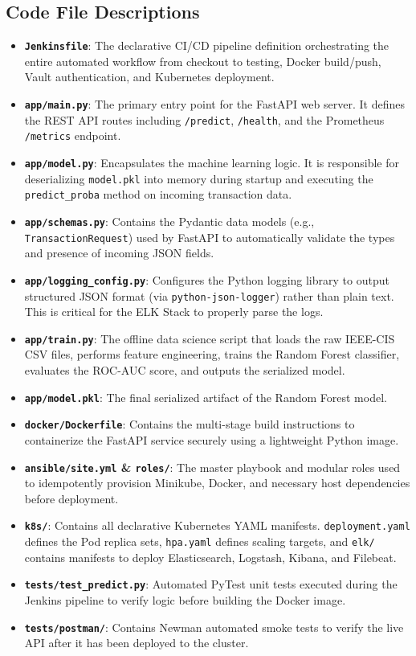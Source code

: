 \documentclass[12pt,a4paper]{article}
\begin{document}
\subsection{Code File Descriptions}
\begin{itemize}
    \item \textbf{\texttt{Jenkinsfile}}: The declarative CI/CD pipeline definition orchestrating the entire automated workflow from checkout to testing, Docker build/push, Vault authentication, and Kubernetes deployment.
    \item \textbf{\texttt{app/main.py}}: The primary entry point for the FastAPI web server. It defines the REST API routes including \texttt{/predict}, \texttt{/health}, and the Prometheus \texttt{/metrics} endpoint.
    \item \textbf{\texttt{app/model.py}}: Encapsulates the machine learning logic. It is responsible for deserializing \texttt{model.pkl} into memory during startup and executing the \texttt{predict\_proba} method on incoming transaction data.
    \item \textbf{\texttt{app/schemas.py}}: Contains the Pydantic data models (e.g., \texttt{TransactionRequest}) used by FastAPI to automatically validate the types and presence of incoming JSON fields.
    \item \textbf{\texttt{app/logging\_config.py}}: Configures the Python logging library to output structured JSON format (via \texttt{python-json-logger}) rather than plain text. This is critical for the ELK Stack to properly parse the logs.
    \item \textbf{\texttt{app/train.py}}: The offline data science script that loads the raw IEEE-CIS CSV files, performs feature engineering, trains the Random Forest classifier, evaluates the ROC-AUC score, and outputs the serialized model.
    \item \textbf{\texttt{app/model.pkl}}: The final serialized artifact of the Random Forest model.
    \item \textbf{\texttt{docker/Dockerfile}}: Contains the multi-stage build instructions to containerize the FastAPI service securely using a lightweight Python image.
    \item \textbf{\texttt{ansible/site.yml} \& \texttt{roles/}}: The master playbook and modular roles used to idempotently provision Minikube, Docker, and necessary host dependencies before deployment.
    \item \textbf{\texttt{k8s/}}: Contains all declarative Kubernetes YAML manifests. \texttt{deployment.yaml} defines the Pod replica sets, \texttt{hpa.yaml} defines scaling targets, and \texttt{elk/} contains manifests to deploy Elasticsearch, Logstash, Kibana, and Filebeat.
    \item \textbf{\texttt{tests/test\_predict.py}}: Automated PyTest unit tests executed during the Jenkins pipeline to verify logic before building the Docker image.
    \item \textbf{\texttt{tests/postman/}}: Contains Newman automated smoke tests to verify the live API after it has been deployed to the cluster.
\end{itemize}
\end{document}

